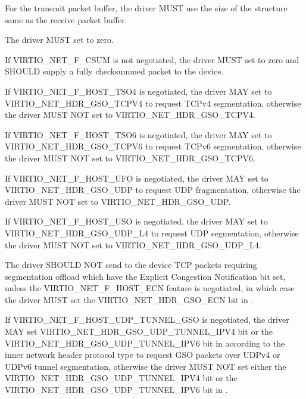 
For the transmit packet buffer, the driver MUST use the size of the
structure  same as the receive packet buffer.

The driver MUST set  to zero.

If VIRTIO_NET_F_CSUM is not negotiated, the driver MUST set
 to zero and SHOULD supply a fully checksummed
packet to the device.

If VIRTIO_NET_F_HOST_TSO4 is negotiated, the driver MAY set
 to VIRTIO_NET_HDR_GSO_TCPV4 to request TCPv4
segmentation, otherwise the driver MUST NOT set
 to VIRTIO_NET_HDR_GSO_TCPV4.

If VIRTIO_NET_F_HOST_TSO6 is negotiated, the driver MAY set
 to VIRTIO_NET_HDR_GSO_TCPV6 to request TCPv6
segmentation, otherwise the driver MUST NOT set
 to VIRTIO_NET_HDR_GSO_TCPV6.

If VIRTIO_NET_F_HOST_UFO is negotiated, the driver MAY set
 to VIRTIO_NET_HDR_GSO_UDP to request UDP
fragmentation, otherwise the driver MUST NOT set
 to VIRTIO_NET_HDR_GSO_UDP.

If VIRTIO_NET_F_HOST_USO is negotiated, the driver MAY set
 to VIRTIO_NET_HDR_GSO_UDP_L4 to request UDP
segmentation, otherwise the driver MUST NOT set
 to VIRTIO_NET_HDR_GSO_UDP_L4.

The driver SHOULD NOT send to the device TCP packets requiring segmentation offload
which have the Explicit Congestion Notification bit set, unless the
VIRTIO_NET_F_HOST_ECN feature is negotiated, in which case the
driver MUST set the VIRTIO_NET_HDR_GSO_ECN bit in
.

If VIRTIO_NET_F_HOST_UDP_TUNNEL_GSO is negotiated, the driver MAY set
VIRTIO_NET_HDR_GSO_UDP_TUNNEL_IPV4 bit or the VIRTIO_NET_HDR_GSO_UDP_TUNNEL_IPV6 bit
in  according to the inner network header protocol type
to request GSO packets over UDPv4 or UDPv6 tunnel segmentation,
otherwise the driver MUST NOT set either the
VIRTIO_NET_HDR_GSO_UDP_TUNNEL_IPV4 bit or the VIRTIO_NET_HDR_GSO_UDP_TUNNEL_IPV6 bit
in .

